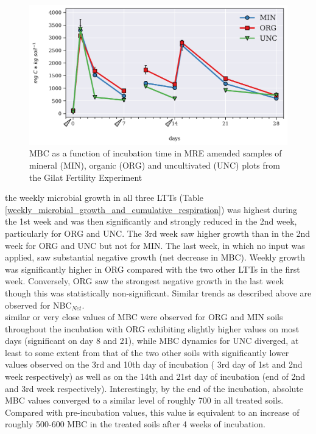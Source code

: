 			\begin{figure}[H]
				\centering
				\includegraphics[scale=0.8,width=\linewidth]{thesis_figures/main_incubation/MRE_treated/MBC.pdf}
				\caption{MBC as a function of incubation time in MRE amended samples of mineral (MIN), organic (ORG) and uncultivated (UNC) plots from the Gilat Fertility Experiment}
				\label{fig:mbc_treated_main}
			\end{figure}
			\vspace{1cm}
			\noindent
			the weekly microbial growth in all three LTTs (Table \ref{weekly_microbial_growth_and_cumulative_respiration}) was highest during the 1st week and was then significantly and strongly reduced in the 2nd week,  particularly for ORG and UNC. The 3rd week saw higher growth than in the 2nd week for ORG and UNC but not for MIN. The last week, in which no input was applied, saw substantial negative growth (net decrease in MBC). Weekly growth was significantly higher in ORG compared with the two other LTTs in the first week. Conversely, ORG saw the strongest negative growth in the last week though this was statistically non-significant. Similar trends as described above are observed for NBC$ _{Net} $.\\
			
			\noindent similar or very close values of MBC were observed for ORG and MIN soils throughout the incubation with ORG exhibiting slightly higher values on most days (significant on day 8 and 21), while MBC dynamics for UNC diverged, at least to some extent from that of the two other soils with significantly lower values observed on the 3rd and 10th day of incubation ( 3rd day of 1st and 2nd week respectively) as well as on the 14th and 21st day of incubation (end of 2nd and 3rd week respectively). Interestingly, by the end of the incubation, absolute MBC values converged to a similar level of roughly 700 \genericunit in all treated soils. Compared with pre-incubation values, this value is equivalent to an increase of  roughly 500-600 \genericunit MBC in the treated soils after 4 weeks of incubation.\\





